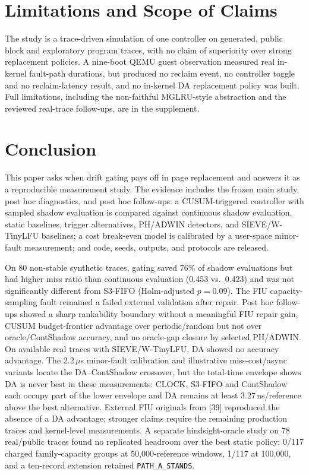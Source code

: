 \documentclass[10pt,twocolumn,a4paper]{IEEEtran}
\begin{document}
\section{Limitations and Scope of Claims}
\label{sec:limits}

The study is a trace-driven simulation of one controller on generated,
public block and exploratory program traces, with no claim of superiority over
strong replacement policies. A nine-boot QEMU guest observation measured real
in-kernel fault-path durations, but produced no reclaim event, no controller
toggle and no reclaim-latency result, and no in-kernel DA replacement policy
was built. Full limitations, including the non-faithful MGLRU-style
abstraction and the reviewed real-trace follow-ups, are in the supplement.

\section{Conclusion}
\label{sec:conclusion}

This paper asks when drift gating pays off in page replacement and answers it
as a reproducible measurement study. The evidence includes the frozen main
study, post hoc diagnostics, and post hoc follow-ups: a CUSUM-triggered
controller with sampled shadow evaluation is compared against continuous
shadow evaluation, static baselines, trigger alternatives, PH/ADWIN detectors,
and SIEVE/W-TinyLFU baselines; a cost break-even model is calibrated by a
user-space minor-fault measurement; and code, seeds, outputs, and protocols are
released.

On 80 non-stable synthetic traces, gating saved 76\% of shadow evaluations
but had higher miss ratio than continuous evaluation (0.453 vs.\ 0.423) and
was not significantly different from S3-FIFO (Holm-adjusted $p=0.09$). The FIU
capacity-sampling fault remained a failed external validation after repair.
Post hoc follow-ups showed a sharp rankability boundary without a
meaningful FIU repair gain, CUSUM budget-frontier advantage over
periodic/random but not over oracle/ContShadow accuracy, and no oracle-gap
closure by selected PH/ADWIN. On available real traces with SIEVE/W-TinyLFU,
DA showed no accuracy advantage. The 2.2\,$\mu$s minor-fault calibration and
illustrative miss-cost/async variants locate the DA--ContShadow crossover, but
the total-time envelope shows DA is never best in these measurements: CLOCK,
S3-FIFO and ContShadow each occupy part of the lower envelope and DA remains
at least 3.27\,ns/reference above the best alternative. External FIU originals
from [39] reproduced the absence of a DA advantage; stronger claims require the
remaining production traces and kernel-level measurements. A separate
hindsight-oracle study on 78 real/public traces found no replicated headroom
over the best static policy: 0/117 charged family-capacity groups at
50{,}000-reference windows, 1/117 at 100{,}000, and a ten-record extension
retained \texttt{PATH\_A\_STANDS}.
\end{document}
